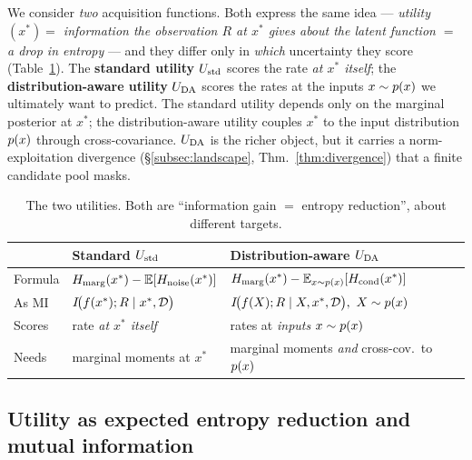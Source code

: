 \begin{remark}\label{rem:two-utilities}
We consider \emph{two} acquisition functions. Both express the same idea ---
\emph{utility$(x^{*})=$ information the observation $R$ at $x^{*}$ gives about the
latent function $=$ a drop in entropy} --- and they differ only in \emph{which}
uncertainty they score (Table~\ref{tab:two-utilities}). The \textbf{standard
utility} $U_{\mathrm{std}}$ scores the rate \emph{at $x^{*}$ itself}; the
\textbf{distribution-aware utility} $U_{\mathrm{DA}}$ scores the rates at the inputs
$x\sim p(x)$ we ultimately want to predict. The standard utility depends only on the
marginal posterior at $x^{*}$; the distribution-aware utility couples $x^{*}$ to the
input distribution $p(x)$ through cross-covariance. $U_{\mathrm{DA}}$ is the richer object, but
it carries a norm-exploitation divergence (\S\ref{subsec:landscape},
Thm.~\ref{thm:divergence}) that a finite candidate pool masks.
\end{remark}

\begin{table}[t]
  \centering
  \small
  \begin{tabular}{@{}lll@{}}
    \toprule
      & \textbf{Standard} $U_{\mathrm{std}}$ & \textbf{Distribution-aware} $U_{\mathrm{DA}}$\\
    \midrule
    Formula      & $H_{\mathrm{marg}}(x^{*})-\mathbb{E}[H_{\mathrm{noise}}(x^{*})]$
                 & $H_{\mathrm{marg}}(x^{*})-\mathbb{E}_{x\sim p(x)}[H_{\mathrm{cond}}(x^{*})]$\\
    As MI        & $I\!\big(f(x^{*});R\mid x^{*},\mathcal D\big)$
                 & $I\!\big(\rate(X);R\mid X,x^{*},\mathcal D\big),\ X\sim\px$\\
    Scores       & rate \emph{at $x^{*}$ itself}
                 & rates at \emph{inputs} $x\sim p(x)$\\
    Needs        & marginal moments at $x^{*}$
                 & marginal moments \emph{and} cross-cov.\ to $p(x)$\\
    \bottomrule
  \end{tabular}
  \caption{The two utilities. Both are ``information gain $=$ entropy reduction'',
  about different targets.}
  \label{tab:two-utilities}
\end{table}

\subsection{Utility as expected entropy reduction and mutual information}
\label{subsec:mi}


